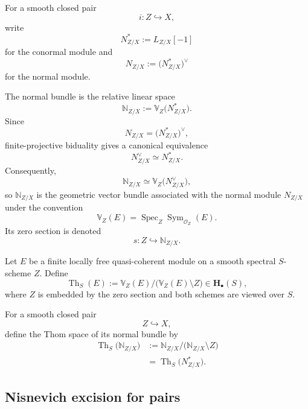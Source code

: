 \begin{notation}
\label{not:normal-data-smooth-closed-pair}
For a smooth closed pair
\[
    i
    \colon
    Z
    \hookrightarrow
    X,
\]
write
\[
    N^*_{Z/X}
    :=
    L_{Z/X}[-1]
\]
for the conormal module and
\[
    N_{Z/X}
    :=
    \bigl(
        N^*_{Z/X}
    \bigr)^\vee
\]
for the normal module.

The normal bundle is the relative linear space
\[
    \mathbb N_{Z/X}
    :=
    \mathbb V_Z
    \bigl(
        N^*_{Z/X}
    \bigr).
\]
Since
\[
    N_{Z/X}
    =
    \bigl(
        N^*_{Z/X}
    \bigr)^\vee,
\]
finite-projective biduality gives a canonical equivalence
\[
    N_{Z/X}^\vee
    \simeq
    N^*_{Z/X}.
\]
Consequently,
\[
    \mathbb N_{Z/X}
    \simeq
    \mathbb V_Z
    \bigl(
        N_{Z/X}^\vee
    \bigr),
\]
so \(\mathbb N_{Z/X}\) is the geometric vector bundle associated with
the normal module \(N_{Z/X}\) under the convention
\[
    \mathbb V_Z(E)
    =
    \operatorname{Spec}_Z
    \operatorname{Sym}_{\mathcal O_Z}(E).
\]
Its zero section is denoted
\[
    s
    \colon
    Z
    \hookrightarrow
    \mathbb N_{Z/X}.
\]
\end{notation}

\begin{definition}
\label{def:unstable-thom-space}
Let \(E\) be a finite locally free quasi-coherent module on a smooth
spectral \(S\)-scheme \(Z\).  Define
\[
    \operatorname{Th}_S(E)
    :=
    \mathbb V_Z(E)/
    \bigl(
        \mathbb V_Z(E)\setminus Z
    \bigr)
    \in
    \mathbf H_\bullet(S),
\]
where \(Z\) is embedded by the zero section and both schemes are viewed
over \(S\).

For a smooth closed pair
\[
    Z
    \hookrightarrow
    X,
\]
define the Thom space of its normal bundle by
\[
\begin{aligned}
    \operatorname{Th}_S
    \bigl(
        \mathbb N_{Z/X}
    \bigr)
    &:=
    \mathbb N_{Z/X}/
    \bigl(
        \mathbb N_{Z/X}\setminus Z
    \bigr)
    \\
    &=
    \operatorname{Th}_S
    \bigl(
        N^*_{Z/X}
    \bigr).
\end{aligned}
\]
\end{definition}

\subsection{Nisnevich excision for pairs}


